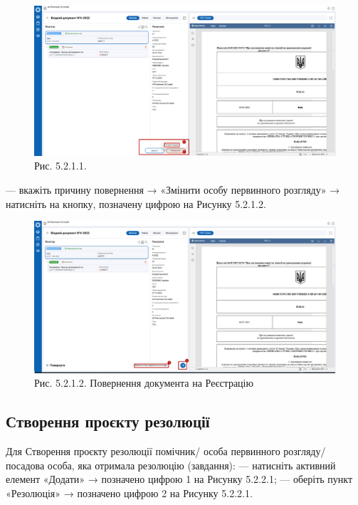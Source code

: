\begin{figure}[!htbp]
\centerline{\includegraphics[width=\textwidth]{img/5.2.1.1.png}}
\caption{Рис. 5.2.1.1. }
\end{figure}

--- вкажіть причину повернення →  «Змінити особу первинного розгляду» →
натисніть на кнопку, позначену цифрою  на Рисунку 5.2.1.2.

\begin{figure}[!htbp]
\centerline{\includegraphics[width=\textwidth]{img/5.2.1.2.png}}
\caption{Рис. 5.2.1.2. Повернення документа на Реєстрацію}
\end{figure}

\subsection{Створення проєкту резолюції}

Для Створення проєкту резолюції помічник/ особа первинного розгляду/ посадова особа, яка отримала резолюцію (завдання):
--- натисніть активний елемент «Додати» → позначено цифрою 1 на Рисунку 5.2.2.1;
--- оберіть пункт «Резолюція» → позначено цифрою 2 на Рисунку 5.2.2.1.

